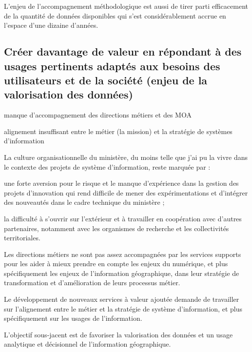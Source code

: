 L'enjeu de l'accompagnement méthodologique est aussi de tirer parti
efficacement de la quantité de données disponibles qui s’est considérablement
accrue en l'espace d'une dizaine d'années.

\subsection[constats:creation_valeur]
{Créer davantage de valeur en répondant à des usages pertinents adaptés aux
besoins des utilisateurs et de la société (enjeu de la valorisation des
données)}

\subject{Constats}

{\it

\startitemize[a,packed]

\item manque d'accompagnement des directions métiers et des MOA

\item alignement insuffisant entre le métier (la mission) et la stratégie de
systèmes d'information

\stopitemize}

La culture organisationnelle du ministère, du moins telle que j'ai pu la vivre
dans le contexte des projets de système d'information, reste marquée par :

\startitemize

\item une forte aversion pour le risque et le manque d'expérience dans la gestion
des projets d'innovation qui rend difficile de mener des expérimentations et
d'intégrer des nouveautés dans le cadre technique du ministère ;

\item la difficulté à s'ouvrir sur l'extérieur et à travailler en coopération avec
d'autres partenaires, notamment avec les organismes de recherche et les
collectivités territoriales.

\stopitemize

Les directions métiers ne sont pas assez accompagnées par les services supports
pour les aider à mieux prendre en
compte les enjeux du numérique, et plus spécifiquement les enjeux de
l'information géographique, dans leur stratégie de transformation et
d'amélioration de leurs processus métier.

Le développement de nouveaux services à valeur ajoutée demande de travailler
sur l'alignement entre le métier et la stratégie de système d'information, et
plus spécifiquement sur les usages de l'information.

L'objectif sous-jacent est de favoriser la valorisation des données et un
usage analytique et décisionnel de l'information géographique.
